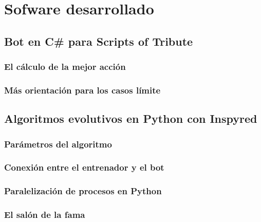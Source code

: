 \chapter{Sofware desarrollado}


\section{Bot en C\# para Scripts of Tribute}

\subsection{El cálculo de la mejor acción}

\subsection{Más orientación para los casos límite}

\section{Algoritmos evolutivos en Python con Inspyred}

\subsection{Parámetros del algoritmo}

\subsection{Conexión entre el entrenador y el bot}

\subsection{Paralelización de procesos en Python}

\subsection{El salón de la fama}
